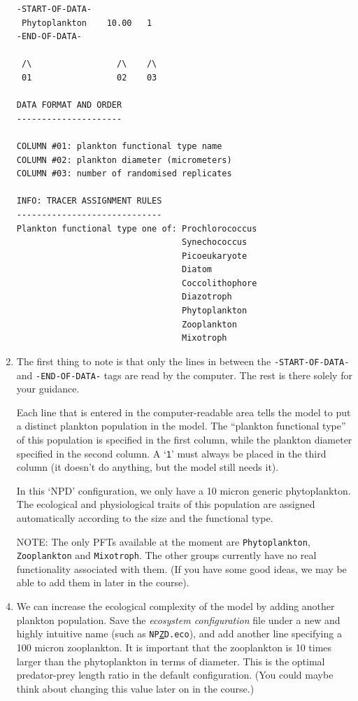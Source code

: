 \documentclass[11pt,fleqn]{book} %
\begin{document}
\begin{enumerate}[noitemsep]
\begin{verbatim}
-START-OF-DATA-
 Phytoplankton    10.00   1
-END-OF-DATA-

 /\                 /\    /\
 01                 02    03

DATA FORMAT AND ORDER
---------------------

COLUMN #01: plankton functional type name
COLUMN #02: plankton diameter (micrometers)
COLUMN #03: number of randomised replicates

INFO: TRACER ASSIGNMENT RULES
-----------------------------
Plankton functional type one of: Prochlorococcus
                                 Synechococcus
                                 Picoeukaryote
                                 Diatom
                                 Coccolithophore
                                 Diazotroph
                                 Phytoplankton
                                 Zooplankton
                                 Mixotroph
\end{verbatim}\normalsize

\item The first thing to note is that only the lines in between the \texttt{\small -START-OF-DATA-} and \texttt{\small -END-OF-DATA-} tags are read by the computer. The rest is there solely for your guidance. 

Each line that is entered in the computer-readable area tells the model to put a distinct plankton population in the model. The ``plankton functional type'' of this population is specified in the first column, while the plankton diameter specified in the second column. A `\texttt{1}' must always be placed in the third column (it doesn't do anything, but the model still needs it).

In this `NPD' configuration, we only have a 10 micron generic phytoplankton. The ecological and physiological traits of this population are assigned automatically according to the size and the functional type. 

\item[NOTE:] The only PFTs available at the moment are \texttt{Phytoplankton}, \texttt{Zooplankton} and \texttt{Mixotroph}. The other groups currently have no real functionality associated with them. (If you have some good ideas, we may be able to add them in later in the course). 

\item We can increase the ecological complexity of the model by adding another plankton population. Save the \textit{ecosystem configuration} file under a new and highly intuitive name (such as \texttt{NP\underline{Z}D.eco}), and add another line specifying a 100 micron zooplankton. It is important that the zooplankton is 10 times larger than the phytoplankton in terms of diameter. This is the optimal predator-prey length ratio in the default configuration. (You could maybe think about changing this value later on in the course.)


\end{enumerate}
\end{document}
